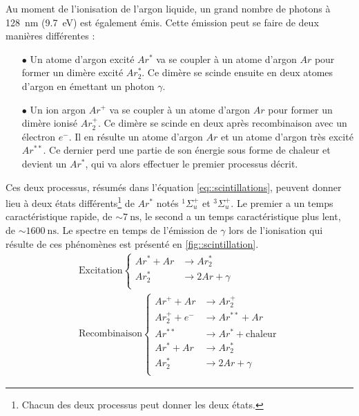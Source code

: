         Au moment de l'ionisation de l'argon liquide, un grand nombre de photons à \SI{128}{\nano\meter}\cite{Gedanken1972} (\SI{9.7}{\eV}) est également émis. Cette émission peut se faire de deux manières différentes :
        \begin{itemize}
          \item[$\bullet$] Un atome d'argon excité $Ar^*$ va se coupler à un atome d'argon $Ar$ pour former un dimère excité $Ar_2 ^*$. Ce dimère se scinde ensuite en deux atomes d'argon en émettant un photon $\gamma$.
          \item[$\bullet$] Un ion argon $Ar^+$ va se coupler à un atome d'argon $Ar$ pour former un dimère ionisé $Ar_2 ^+$. Ce dimère se scinde en deux après recombinaison avec un électron $e^-$. Il en résulte un atome d'argon $Ar$ et un atome d'argon très excité $Ar^{**}$. Ce dernier perd une partie de son énergie sous forme de chaleur et devient un $Ar^*$, qui va alors effectuer le premier processus décrit.
        \end{itemize} 
        Ces deux processus, résumés dans l'équation \eqref{eq::scintillations}, peuvent donner lieu à deux états différents\footnote{Chacun des deux processus peut donner les deux états.} de $Ar^*$ notés $^1\Sigma_u^+$ et  $^3\Sigma_u^+$. Le premier a un temps caractéristique rapide, de $\sim\SI{7}{\nano\second}$, le second a un temps caractéristique plus lent, de $\sim\SI{1600}{\nano\second}$\cite{Hitachi1983}. Le spectre en temps de l'émission de $\gamma$ lors de l'ionisation qui résulte de ces phénomènes est présenté en \autoref{fig::scintillation}.
        \begin{equation} \label{eq::scintilation}
            \begin{split}
            \text{Excitation}\begin{cases}
            Ar^* + Ar & \to Ar_2^* \\
            Ar_2^* & \to 2Ar + \gamma\\
            \end{cases} \\
            \text{Recombinaison}\begin{cases}
            Ar^+ + Ar & \to Ar_2^+  \\
            Ar_2^+ + e^- & \to Ar^{**}+Ar  \\
            Ar^{**} & \to Ar^*+\text{chaleur}  \\
            Ar^* + Ar & \to Ar_2^*  \\
            Ar_2^* & \to 2Ar + \gamma \\
            \end{cases}
            \end{split}
        \end{equation}

